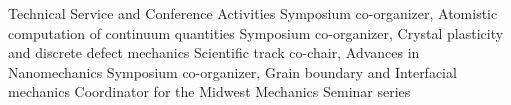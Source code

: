 \documentclass[numbers]{cv}
\begin{document}
\begin{service}
    \serviceitem
        {Technical Service and Conference Activities}
        {
             {\hspace{-0.6cm}Symposium co-organizer, Atomistic computation of continuum quantities} {}
             {\hspace{-0.6cm}Symposium co-organizer, Crystal plasticity and discrete defect mechanics} {}
             {\hspace{-0.6cm}Scientific track co-chair, Advances in Nanomechanics}{}
             {\hspace{-0.6cm}Symposium co-organizer, Grain boundary and Interfacial mechanics}{}
             {\hspace{-0.6cm}Coordinator for the Midwest Mechanics Seminar series} {}
}
\end{service}
\end{document}
